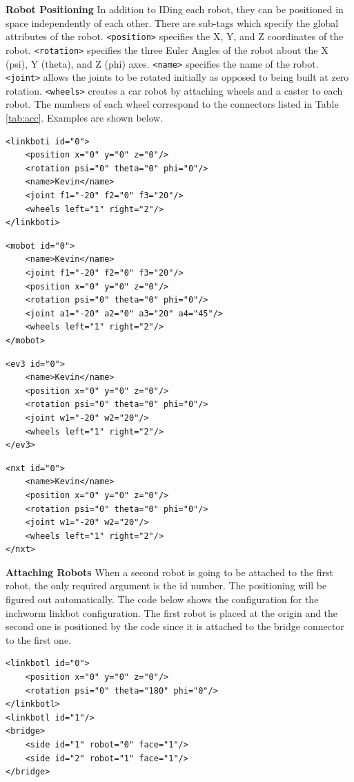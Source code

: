 \documentclass{article}
\begin{document}
\noindent
\newline
\textbf{Robot Positioning}
\newline
In addition to IDing each robot, they can be positioned in space independently
of each other.  There are sub-tags which specify the global attributes of the
robot.  \texttt{<position>} specifies the X, Y, and Z coordinates of the robot.
\texttt{<rotation>} specifies the three Euler Angles of the robot about the X
(psi), Y (theta), and Z (phi) axes.  \texttt{<name>} specifies the name of the
robot.  \texttt{<joint>} allows the joints to be rotated initially as opposed to
being built at zero rotation.  \texttt{<wheels>} creates a car robot by
attaching wheels and a caster to each robot.  The numbers of each wheel
correspond to the connectors listed in Table \ref{tab:acc}.  Examples are shown
below.
\begin{verbatim}
<linkboti id="0">
    <position x="0" y="0" z="0"/>
    <rotation psi="0" theta="0" phi="0"/>
	<name>Kevin</name>
    <joint f1="-20" f2="0" f3="20"/>
	<wheels left="1" right="2"/>
</linkboti>
\end{verbatim}
\begin{verbatim}
<mobot id="0">
	<name>Kevin</name>
    <joint f1="-20" f2="0" f3="20"/>
    <position x="0" y="0" z="0"/>
    <rotation psi="0" theta="0" phi="0"/>
    <joint a1="-20" a2="0" a3="20" a4="45"/>
	<wheels left="1" right="2"/>
</mobot>
\end{verbatim}
\begin{verbatim}
<ev3 id="0">
	<name>Kevin</name>
    <position x="0" y="0" z="0"/>
    <rotation psi="0" theta="0" phi="0"/>
    <joint w1="-20" w2="20"/>
	<wheels left="1" right="2"/>
</ev3>
\end{verbatim}
\begin{verbatim}
<nxt id="0">
	<name>Kevin</name>
    <position x="0" y="0" z="0"/>
    <rotation psi="0" theta="0" phi="0"/>
    <joint w1="-20" w2="20"/>
	<wheels left="1" right="2"/>
</nxt>
\end{verbatim}

\noindent
\newline
\textbf{Attaching Robots}
\newline
When a second robot is going to be attached to the first robot, the only
required argument is the id number.  The positioning will be figured out
automatically.  The code below shows the configuration for the inchworm linkbot
configuration.  The first robot is placed at the origin and the second one is
positioned by the code since it is attached to the bridge connector to the first
one.
\begin{verbatim}
<linkbotl id="0">
    <position x="0" y="0" z="0"/>
    <rotation psi="0" theta="180" phi="0"/>
</linkbotl>
<linkbotl id="1"/>
<bridge>
    <side id="1" robot="0" face="1"/>
    <side id="2" robot="1" face="1"/>
</bridge>
\end{verbatim}
\end{document}
